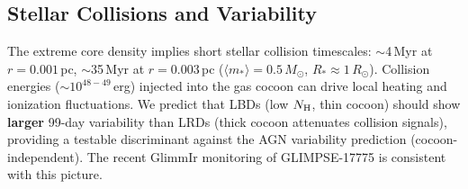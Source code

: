 \documentclass[twocolumn,linenumbers]{aastex631}
\begin{document}
\subsection{Stellar Collisions and Variability}

The extreme core density implies short stellar collision timescales: $\sim$4\,Myr at $r=0.001$\,pc, $\sim$35\,Myr at $r=0.003$\,pc ($\langle m_* \rangle = 0.5\,M_\odot$, $R_* \approx 1\,R_\odot$). Collision energies ($\sim$$10^{48-49}$\,erg) injected into the gas cocoon can drive local heating and ionization fluctuations. We predict that LBDs (low $N_{\rm H}$, thin cocoon) should show \textbf{larger} 99-day variability than LRDs (thick cocoon attenuates collision signals), providing a testable discriminant against the AGN variability prediction (cocoon-independent). The recent GlimmIr monitoring of GLIMPSE-17775 \citep[30--42\% over 99 days;][]{GlimmIr2026} is consistent with this picture.
\end{document}
